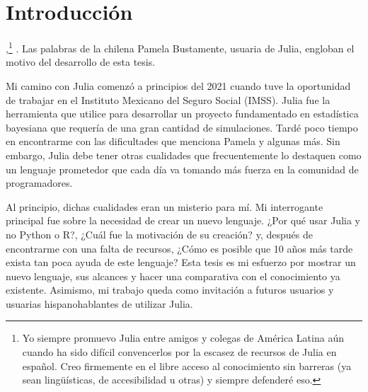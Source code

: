 \chapter{Introducción}

\textit{},\footnote{Yo siempre promuevo Julia entre amigos y colegas de América Latina aún cuando ha sido difícil convencerlos por la escasez de recursos de Julia en español. Creo firmemente en el libre acceso al conocimiento sin barreras (ya sean lingüísticas, de accesibilidad u otras) y siempre defenderé eso.} \cite{articulo_10anos}. Las palabras de la chilena Pamela Bustamente, usuaria de \textsf{Julia},  engloban el motivo del desarrollo de esta tesis.  

Mi camino con \textsf{Julia} comenzó a principios del 2021 cuando tuve la oportunidad de trabajar en el Instituto Mexicano del Seguro Social (IMSS). \textsf{Julia} fue la herramienta que utilice para desarrollar un proyecto fundamentado en estadística bayesiana que requería de una gran cantidad de simulaciones. Tardé poco tiempo en encontrarme con las dificultades que menciona Pamela y algunas más. Sin embargo, \textsf{Julia} debe tener otras cualidades que frecuentemente lo destaquen como un lenguaje prometedor que cada día va tomando más fuerza en la comunidad de programadores. 

Al principio, dichas cualidades eran un misterio para mí. Mi interrogante principal fue sobre la necesidad de crear un nuevo lenguaje. ¿Por qué usar \textsf{Julia} y no \textsf{Python} o \textsf{R}?, ¿Cuál fue la motivación de su creación? y, después de encontrarme con una falta de recursos, ¿Cómo es posible que 10 años más tarde exista tan poca ayuda de este lenguaje?  Esta tesis es mi esfuerzo por mostrar un nuevo lenguaje, sus alcances y hacer una comparativa con el conocimiento ya existente. Asimismo, mi trabajo queda como invitación a futuros usuarios y usuarias hispanohablantes de utilizar \textsf{Julia}.

